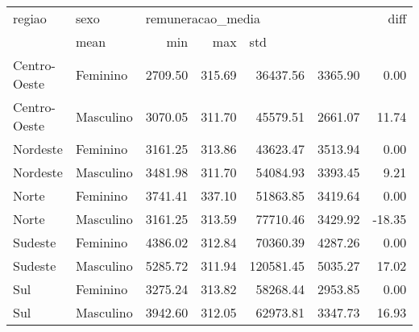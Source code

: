 \begin{tabular}{llrrrrr}
\toprule
      regiao &      sexo & \multicolumn{4}{l}{remuneracao\_media} &   diff \\
             &              mean &    min &       max & \multicolumn{2}{l}{std} \\
\midrule
Centro-Oeste &  Feminino &           2709.50 & 315.69 &  36437.56 & 3365.90 &   0.00 \\
Centro-Oeste & Masculino &           3070.05 & 311.70 &  45579.51 & 2661.07 &  11.74 \\
    Nordeste &  Feminino &           3161.25 & 313.86 &  43623.47 & 3513.94 &   0.00 \\
    Nordeste & Masculino &           3481.98 & 311.70 &  54084.93 & 3393.45 &   9.21 \\
       Norte &  Feminino &           3741.41 & 337.10 &  51863.85 & 3419.64 &   0.00 \\
       Norte & Masculino &           3161.25 & 313.59 &  77710.46 & 3429.92 & -18.35 \\
     Sudeste &  Feminino &           4386.02 & 312.84 &  70360.39 & 4287.26 &   0.00 \\
     Sudeste & Masculino &           5285.72 & 311.94 & 120581.45 & 5035.27 &  17.02 \\
         Sul &  Feminino &           3275.24 & 313.82 &  58268.44 & 2953.85 &   0.00 \\
         Sul & Masculino &           3942.60 & 312.05 &  62973.81 & 3347.73 &  16.93 \\
\bottomrule
\end{tabular}
